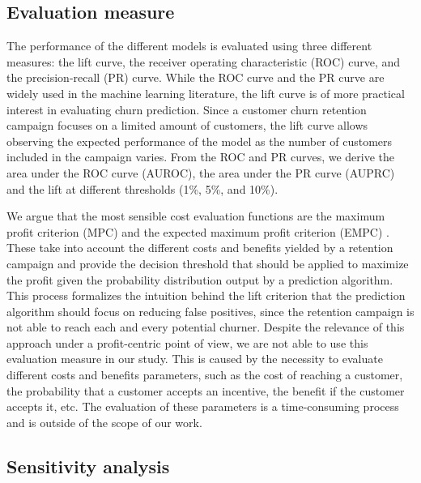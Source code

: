 \subsection{Evaluation measure}

The performance of the different models is evaluated using three different
measures: the lift curve, the receiver operating characteristic (ROC) curve, and
the precision-recall (PR) curve. While the ROC curve and the PR curve are widely
used in the machine learning literature, the lift curve is of more practical
interest in evaluating churn prediction. Since a customer churn retention
campaign focuses on a limited amount of customers, the lift curve allows
observing the expected performance of the model as the number of customers
included in the campaign varies. From the ROC and PR curves, we derive the area
under the ROC curve (AUROC), the area under the PR curve (AUPRC) and the lift at
different thresholds (1\%, 5\%, and 10\%).

We argue that the most sensible cost evaluation functions are the maximum profit
criterion (MPC) and the expected maximum profit criterion (EMPC)
\parencite{verbeke2012new, verbraken2013novel}. These take into account the
different costs and benefits yielded by a retention campaign and provide the
decision threshold that should be applied to maximize the profit given the
probability distribution output by a prediction algorithm. This process
formalizes the intuition behind the lift criterion that the prediction algorithm
should focus on reducing false positives, since the retention campaign is not
able to reach each and every potential churner. Despite the relevance of this
approach under a profit-centric point of view, we are not able to use this
evaluation measure in our study. This is caused by the necessity to evaluate
different costs and benefits parameters, such as the cost of reaching a
customer, the probability that a customer accepts an incentive, the benefit if
the customer accepts it, etc. The evaluation of these parameters is a
time-consuming process and is outside of the scope of our work.


\subsection{Sensitivity analysis}
\label{sec:churn_sens}

